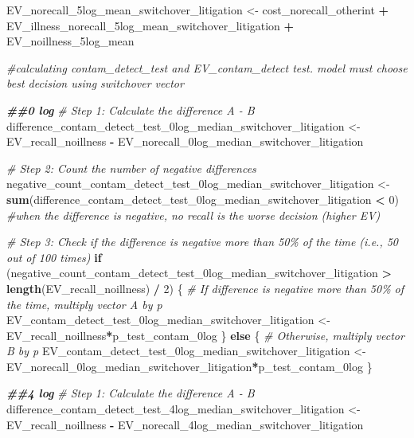 \documentclass[
]{article}
\newenvironment{Shaded}{\begin{snugshade}}{\end{snugshade}}
\newcommand{\CommentTok}[1]{\textcolor[rgb]{0.56,0.35,0.01}{\textit{#1}}}
\newcommand{\ControlFlowTok}[1]{\textcolor[rgb]{0.13,0.29,0.53}{\textbf{#1}}}
\newcommand{\DecValTok}[1]{\textcolor[rgb]{0.00,0.00,0.81}{#1}}
\newcommand{\DocumentationTok}[1]{\textcolor[rgb]{0.56,0.35,0.01}{\textbf{\textit{#1}}}}
\newcommand{\FunctionTok}[1]{\textcolor[rgb]{0.13,0.29,0.53}{\textbf{#1}}}
\newcommand{\NormalTok}[1]{#1}
\newcommand{\OtherTok}[1]{\textcolor[rgb]{0.56,0.35,0.01}{#1}}
\newcommand{\SpecialCharTok}[1]{\textcolor[rgb]{0.81,0.36,0.00}{\textbf{#1}}}
\begin{document}
\begin{Shaded}
\begin{Highlighting}[]
\NormalTok{EV\_norecall\_5log\_mean\_switchover\_litigation }\OtherTok{\textless{}{-}}\NormalTok{ cost\_norecall\_otherint }\SpecialCharTok{+}\NormalTok{ EV\_illness\_norecall\_5log\_mean\_switchover\_litigation }\SpecialCharTok{+}\NormalTok{ EV\_noillness\_5log\_mean}

\CommentTok{\#calculating contam\_detect\_test and EV\_contam\_detect test. model must choose best decision using switchover vector}

\DocumentationTok{\#\#0 log}
\CommentTok{\# Step 1: Calculate the difference A {-} B}
\NormalTok{difference\_contam\_detect\_test\_0log\_median\_switchover\_litigation }\OtherTok{\textless{}{-}}\NormalTok{ EV\_recall\_noillness }\SpecialCharTok{{-}}\NormalTok{ EV\_norecall\_0log\_median\_switchover\_litigation}

\CommentTok{\# Step 2: Count the number of negative differences}
\NormalTok{negative\_count\_contam\_detect\_test\_0log\_median\_switchover\_litigation }\OtherTok{\textless{}{-}} \FunctionTok{sum}\NormalTok{(difference\_contam\_detect\_test\_0log\_median\_switchover\_litigation }\SpecialCharTok{\textless{}} \DecValTok{0}\NormalTok{) }\CommentTok{\#when the difference is negative, no recall is the worse decision (higher EV)}

\CommentTok{\# Step 3: Check if the difference is negative more than 50\% of the time (i.e., 50 out of 100 times)}
\ControlFlowTok{if}\NormalTok{ (negative\_count\_contam\_detect\_test\_0log\_median\_switchover\_litigation }\SpecialCharTok{\textgreater{}} \FunctionTok{length}\NormalTok{(EV\_recall\_noillness) }\SpecialCharTok{/} \DecValTok{2}\NormalTok{) \{}
  \CommentTok{\# If difference is negative more than 50\% of the time, multiply vector A by p}
\NormalTok{  EV\_contam\_detect\_test\_0log\_median\_switchover\_litigation }\OtherTok{\textless{}{-}}\NormalTok{ EV\_recall\_noillness}\SpecialCharTok{*}\NormalTok{p\_test\_contam\_0log}
\NormalTok{\} }\ControlFlowTok{else}\NormalTok{ \{}
  \CommentTok{\# Otherwise, multiply vector B by p}
\NormalTok{ EV\_contam\_detect\_test\_0log\_median\_switchover\_litigation }\OtherTok{\textless{}{-}}\NormalTok{ EV\_norecall\_0log\_median\_switchover\_litigation}\SpecialCharTok{*}\NormalTok{p\_test\_contam\_0log}
\NormalTok{\}}


\DocumentationTok{\#\#4 log}
\CommentTok{\# Step 1: Calculate the difference A {-} B}
\NormalTok{difference\_contam\_detect\_test\_4log\_median\_switchover\_litigation }\OtherTok{\textless{}{-}}\NormalTok{ EV\_recall\_noillness }\SpecialCharTok{{-}}\NormalTok{ EV\_norecall\_4log\_median\_switchover\_litigation}


\end{Highlighting}
\end{Shaded}
\end{document}
